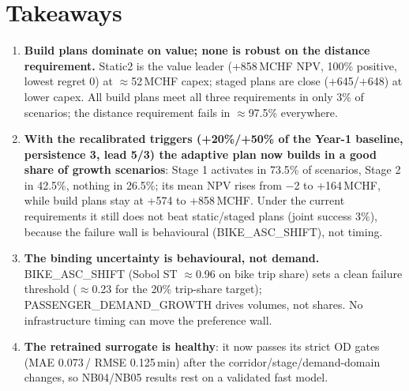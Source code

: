 \documentclass[10pt,a4paper]{article}
\begin{document}
\section{Takeaways}
\begin{enumerate}
\item \textbf{Build plans dominate on value; none is robust on the distance requirement.} Static2 is the value leader (+858\,MCHF NPV, 100\% positive, lowest regret 0) at $\approx$52\,MCHF capex; staged plans are close (+645/$+$648) at lower capex. All build plans meet all three requirements in only 3\% of scenarios; the distance requirement fails in $\approx$97.5\% everywhere.
\item \textbf{With the recalibrated triggers (+20\%/+50\% of the Year-1 baseline, persistence 3, lead 5/3) the adaptive plan now builds in a good share of growth scenarios}: Stage 1 activates in 73.5\% of scenarios, Stage 2 in 42.5\%, nothing in 26.5\%; its mean NPV rises from $-$2 to +164\,MCHF, while build plans stay at +574 to +858\,MCHF. Under the current requirements it still does not beat static/staged plans (joint success 3\%), because the failure wall is behavioural (BIKE\_ASC\_SHIFT), not timing.
\item \textbf{The binding uncertainty is behavioural, not demand.} BIKE\_ASC\_SHIFT (Sobol ST $\approx$0.96 on bike trip share) sets a clean failure threshold ($\approx$0.23 for the 20\% trip-share target); PASSENGER\_DEMAND\_GROWTH drives volumes, not shares. No infrastructure timing can move the preference wall.
\item \textbf{The retrained surrogate is healthy}: it now passes its strict OD gates (MAE 0.073\,/ RMSE 0.125\,min) after the corridor/stage/demand-domain changes, so NB04/NB05 results rest on a validated fast model.
\end{enumerate}
\end{document}
